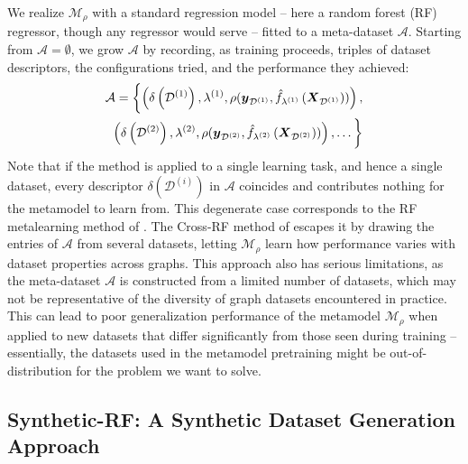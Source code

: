 We realize \( \mathcal{M}_\rho \) with a standard regression model -- here a random forest (RF) regressor, though any regressor would serve -- fitted to a meta-dataset \( \mathcal{A} \). Starting from \( \mathcal{A} = \emptyset \), we grow \( \mathcal{A} \) by recording, as training proceeds, triples of dataset descriptors, the configurations tried, and the performance they achieved:
\begin{equation*}
	\begin{split}
		\mathcal{A} = \biggl\{ \left( \delta \left( \mathcal{D}^{(1)} \right), \lambda^{(1)}, \rho( \boldsymbol{y}_{\mathcal{D}^{(1)}}, \hat{f}_{\lambda^{(1)}} \left( \boldsymbol{X}_{\mathcal{D}^{(1)}} \right) ) \right), \\
		\left( \delta \left( \mathcal{D}^{(2)} \right), \lambda^{(2)}, \rho( \boldsymbol{y}_{\mathcal{D}^{(2)}}, \hat{f}_{\lambda^{(2)}} \left( \boldsymbol{X}_{\mathcal{D}^{(2)}} \right) ) \right), \dots \biggr\}
	\end{split}
\end{equation*}
Note that if the method is applied to a single learning task, and hence a single dataset, every descriptor \( \delta \left( \mathcal{D}^{(i)} \right) \) in \( \mathcal{A} \) coincides and contributes nothing for the metamodel to learn from. This degenerate case corresponds to the RF metalearning method of \cite{prochazka_which_2023}. The Cross-RF method of \cite{dedic_benchmarking_2026} escapes it by drawing the entries of \( \mathcal{A} \) from several datasets, letting \( \mathcal{M}_\rho \) learn how performance varies with dataset properties across graphs.
This approach also has serious limitations, as the meta-dataset \( \mathcal{A} \) is constructed from a limited number of datasets, which may not be representative of the diversity of graph datasets encountered in practice. This can lead to poor generalization performance of the metamodel \( \mathcal{M}_\rho \) when applied to new datasets that differ significantly from those seen during training -- essentially, the datasets used in the metamodel pretraining might be out-of-distribution for the problem we want to solve.

\subsection{Synthetic-RF: A Synthetic Dataset Generation Approach}
\label{sec:synthetic-rf}

